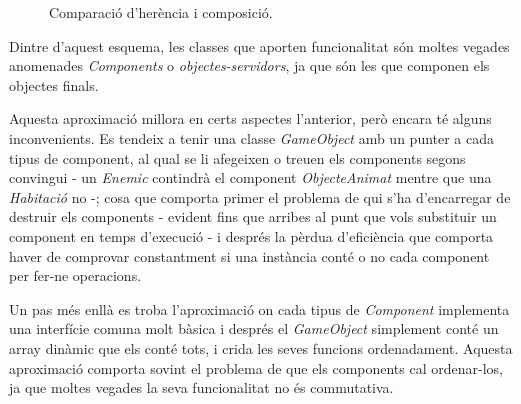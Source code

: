 \begin{figure}
  \centering
  \hspace{0.08\textwidth}
  \caption{Comparació d'herència i composició. \label{fig:HerenciaAgregacio}}
\end{figure}

Dintre d'aquest esquema, les classes que aporten funcionalitat són moltes vegades anomenades {\em Components} o {\em objectes-servidors}, ja que són les que componen els objectes finals.

Aquesta aproximació millora en certs aspectes l'anterior, però encara té alguns inconvenients. Es tendeix a tenir una classe {\em GameObject} amb un punter a cada tipus de component, al qual se li afegeixen o treuen els components segons convingui - un {\em Enemic} contindrà el component {\em ObjecteAnimat} mentre que una {\em Habitació} no -; cosa que comporta primer el problema de qui s'ha d'encarregar de destruir els components - evident fins que arribes al punt que vols substituir un component en temps d'execució - i després la pèrdua d'eficiència que comporta haver de comprovar constantment si una instància conté o no cada component per fer-ne operacions.

Un pas més enllà es troba l'aproximació on cada tipus de {\em Component} implementa una interfície comuna molt bàsica i després el {\em GameObject} simplement conté un array dinàmic que els conté tots, i crida les seves funcions ordenadament. Aquesta aproximació comporta sovint el problema de que els components cal ordenar-los, ja que moltes vegades la seva funcionalitat no és commutativa.

